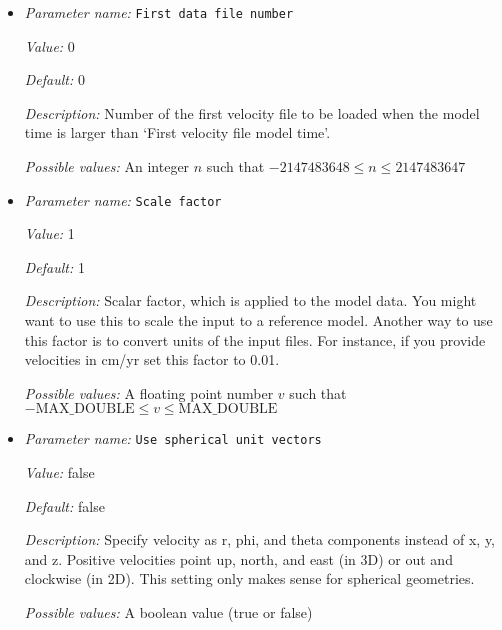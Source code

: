 \begin{itemize}
{\it Possible values:} A floating point number $v$ such that $0 \leq v \leq \text{MAX\_DOUBLE}$
\item {\it Parameter name:} {\tt First data file number}
\label{parameters:Boundary velocity model/Ascii data model/First data file number}
\label{parameters:Boundary_20velocity_20model/Ascii_20data_20model/First_20data_20file_20number}


{\it Value:} 0


{\it Default:} 0


{\it Description:} Number of the first velocity file to be loaded when the model time is larger than `First velocity file model time'.


{\it Possible values:} An integer $n$ such that $-2147483648\leq n \leq 2147483647$
\item {\it Parameter name:} {\tt Scale factor}
\label{parameters:Boundary velocity model/Ascii data model/Scale factor}
\label{parameters:Boundary_20velocity_20model/Ascii_20data_20model/Scale_20factor}


{\it Value:} 1


{\it Default:} 1


{\it Description:} Scalar factor, which is applied to the model data. You might want to use this to scale the input to a reference model. Another way to use this factor is to convert units of the input files. For instance, if you provide velocities in cm/yr set this factor to 0.01.


{\it Possible values:} A floating point number $v$ such that $-\text{MAX\_DOUBLE} \leq v \leq \text{MAX\_DOUBLE}$
\item {\it Parameter name:} {\tt Use spherical unit vectors}
\label{parameters:Boundary velocity model/Ascii data model/Use spherical unit vectors}
\label{parameters:Boundary_20velocity_20model/Ascii_20data_20model/Use_20spherical_20unit_20vectors}


{\it Value:} false


{\it Default:} false


{\it Description:} Specify velocity as r, phi, and theta components instead of x, y, and z. Positive velocities point up, north, and east (in 3D) or out and clockwise (in 2D). This setting only makes sense for spherical geometries.


{\it Possible values:} A boolean value (true or false)
\end{itemize}

